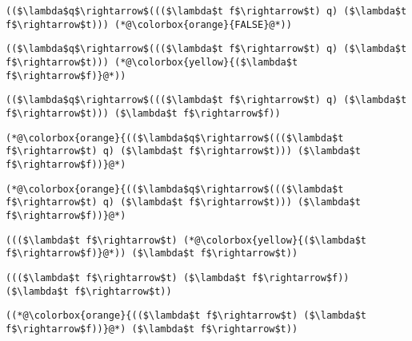 \documentclass{beamer}
\begin{document}
\begin{frame}[fragile]{\CurrentSection}
\lstset{basicstyle=\ttfamily\small}\lstset{numbers=none}\lstset{language=ML}\begin{lstlisting}
(($\lambda$q$\rightarrow$((($\lambda$t f$\rightarrow$t) q) ($\lambda$t f$\rightarrow$t))) (*@\colorbox{orange}{FALSE}@*))
\end{lstlisting}
\pause\lstset{language=ML}\begin{lstlisting}
(($\lambda$q$\rightarrow$((($\lambda$t f$\rightarrow$t) q) ($\lambda$t f$\rightarrow$t))) (*@\colorbox{yellow}{($\lambda$t f$\rightarrow$f)}@*))
\end{lstlisting}

\end{frame}

\begin{frame}[fragile]{\CurrentSection}
\lstset{basicstyle=\ttfamily\small}\lstset{numbers=none}\lstset{language=ML}\begin{lstlisting}
(($\lambda$q$\rightarrow$((($\lambda$t f$\rightarrow$t) q) ($\lambda$t f$\rightarrow$t))) ($\lambda$t f$\rightarrow$f))
\end{lstlisting}
\pause\lstset{language=ML}\begin{lstlisting}
(*@\colorbox{orange}{(($\lambda$q$\rightarrow$((($\lambda$t f$\rightarrow$t) q) ($\lambda$t f$\rightarrow$t))) ($\lambda$t f$\rightarrow$f))}@*)
\end{lstlisting}

\end{frame}

\begin{frame}[fragile]{\CurrentSection}
\lstset{basicstyle=\ttfamily\small}\lstset{numbers=none}\lstset{language=ML}\begin{lstlisting}
(*@\colorbox{orange}{(($\lambda$q$\rightarrow$((($\lambda$t f$\rightarrow$t) q) ($\lambda$t f$\rightarrow$t))) ($\lambda$t f$\rightarrow$f))}@*)
\end{lstlisting}
\pause\lstset{language=ML}\begin{lstlisting}
((($\lambda$t f$\rightarrow$t) (*@\colorbox{yellow}{($\lambda$t f$\rightarrow$f)}@*)) ($\lambda$t f$\rightarrow$t))
\end{lstlisting}

\end{frame}

\begin{frame}[fragile]{\CurrentSection}
\lstset{basicstyle=\ttfamily\small}\lstset{numbers=none}\lstset{language=ML}\begin{lstlisting}
((($\lambda$t f$\rightarrow$t) ($\lambda$t f$\rightarrow$f)) ($\lambda$t f$\rightarrow$t))
\end{lstlisting}
\pause\lstset{language=ML}\begin{lstlisting}
((*@\colorbox{orange}{(($\lambda$t f$\rightarrow$t) ($\lambda$t f$\rightarrow$f))}@*) ($\lambda$t f$\rightarrow$t))
\end{lstlisting}

\end{frame}
\end{document}
